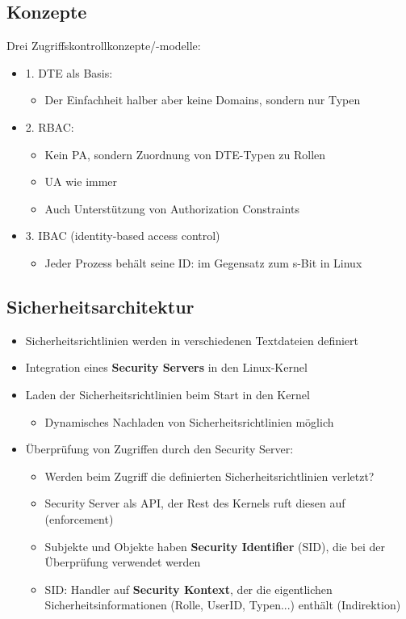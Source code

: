 \documentclass[openany]{book}
\begin{document}
\subsection{Konzepte}

Drei Zugriffskontrollkonzepte/-modelle:
\begin{itemize}
    \item 1. DTE als Basis:
    \begin{itemize}
        \item Der Einfachheit halber aber keine Domains, sondern nur Typen
    \end{itemize}
    \item 2. RBAC:
    \begin{itemize}
        \item Kein PA, sondern Zuordnung von DTE-Typen zu Rollen
        \item UA wie immer
        \item Auch Unterstützung von Authorization Constraints
    \end{itemize}
    \item 3. IBAC (identity-based access control)
    \begin{itemize}
        \item Jeder Prozess behält seine ID: im Gegensatz zum s-Bit in Linux
    \end{itemize}
\end{itemize}

\subsection{Sicherheitsarchitektur}

\begin{itemize}
    \item Sicherheitsrichtlinien werden in verschiedenen Textdateien definiert
    \item Integration eines \textbf{Security Servers} in den Linux-Kernel
    \item Laden der Sicherheitsrichtlinien beim Start in den Kernel
    \begin{itemize}
        \item Dynamisches Nachladen von Sicherheitsrichtlinien möglich
    \end{itemize}
    \item Überprüfung von Zugriffen durch den Security Server:
    \begin{itemize}
        \item Werden beim Zugriff die definierten Sicherheitsrichtlinien verletzt?
        \item Security Server als API, der Rest des Kernels ruft diesen auf (enforcement)
        \item Subjekte und Objekte haben \textbf{Security Identifier} (SID), die bei der Überprüfung verwendet werden
        \item SID: Handler auf \textbf{Security Kontext}, der die eigentlichen Sicherheitsinformationen (Rolle, UserID, Typen...) enthält (Indirektion)
    \end{itemize}
\end{itemize}
\end{document}
